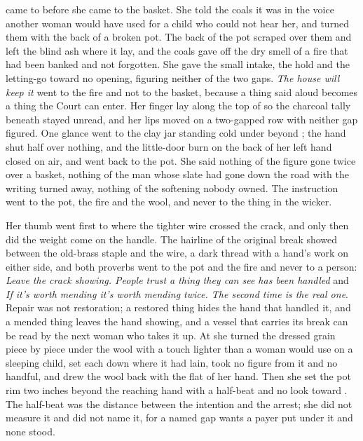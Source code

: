 \scenebreak

 came to  before she came to the basket. She told the coals it was  in the voice another woman would have used for a child who could not hear her, and turned them with the back of a broken pot. The back of the pot scraped over them and left the blind ash where it lay, and the coals gave off the dry smell of a fire that had been banked and not forgotten. She gave the small intake, the hold and the letting-go toward no opening, figuring neither of the two gaps. \emph{The house will keep it} went to the fire and not to the basket, because a thing said aloud becomes a thing the Court can enter. Her finger lay along the top of  so the charcoal tally beneath stayed unread, and her lips moved on a two-gapped row with neither gap figured. One glance went to the clay jar standing cold under  beyond ; the hand shut half over nothing, and the little-door burn on the back of her left hand closed on air, and went back to the pot. She said nothing of the figure gone twice over a basket, nothing of the man whose slate had gone down the road with the writing turned away, nothing of the softening nobody owned. The instruction went to the pot, the fire and the wool, and never to the thing in the wicker.

Her thumb went first to where the tighter wire crossed the crack, and only then did the weight come on the handle. The hairline of the original break showed between the old-brass staple and the wire, a dark thread with a hand's work on either side, and both proverbs went to the pot and the fire and never to a person: \emph{Leave the crack showing. People trust a thing they can see has been handled} and \emph{If it's worth mending it's worth mending twice. The second time is the real one}. Repair was not restoration; a restored thing hides the hand that handled it, and a mended thing leaves the hand showing, and a vessel that carries its break can be read by the next woman who takes it up. At  she turned the dressed grain piece by piece under the wool with a touch lighter than a woman would use on a sleeping child, set each down where it had lain, took no figure from it and no handful, and drew the wool back with the flat of her hand. Then she set the pot rim two inches beyond the reaching hand with a half-beat and no look toward . The half-beat was the distance between the intention and the arrest; she did not measure it and did not name it, for a named gap wants a payer put under it and none stood.

